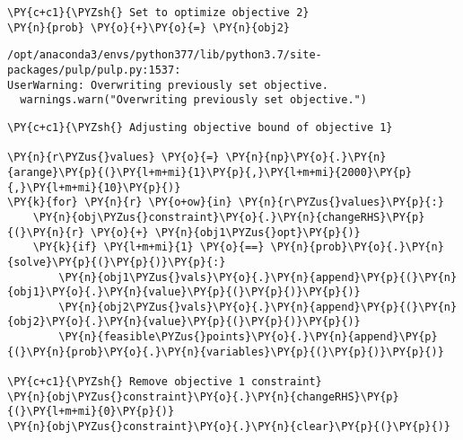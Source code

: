     \begin{tcolorbox}[breakable, size=fbox, boxrule=1pt, pad at break*=1mm,colback=cellbackground, colframe=cellborder]
\begin{Verbatim}[commandchars=\\\{\}]
\PY{c+c1}{\PYZsh{} Set to optimize objective 2}
\PY{n}{prob} \PY{o}{+}\PY{o}{=} \PY{n}{obj2}
\end{Verbatim}
\end{tcolorbox}

    \begin{Verbatim}[commandchars=\\\{\}]
/opt/anaconda3/envs/python377/lib/python3.7/site-packages/pulp/pulp.py:1537:
UserWarning: Overwriting previously set objective.
  warnings.warn("Overwriting previously set objective.")
    \end{Verbatim}

    \begin{tcolorbox}[breakable, size=fbox, boxrule=1pt, pad at break*=1mm,colback=cellbackground, colframe=cellborder]
\begin{Verbatim}[commandchars=\\\{\}]
\PY{c+c1}{\PYZsh{} Adjusting objective bound of objective 1}

\PY{n}{r\PYZus{}values} \PY{o}{=} \PY{n}{np}\PY{o}{.}\PY{n}{arange}\PY{p}{(}\PY{l+m+mi}{1}\PY{p}{,}\PY{l+m+mi}{2000}\PY{p}{,}\PY{l+m+mi}{10}\PY{p}{)}
\PY{k}{for} \PY{n}{r} \PY{o+ow}{in} \PY{n}{r\PYZus{}values}\PY{p}{:}
    \PY{n}{obj\PYZus{}constraint}\PY{o}{.}\PY{n}{changeRHS}\PY{p}{(}\PY{n}{r} \PY{o}{+} \PY{n}{obj1\PYZus{}opt}\PY{p}{)}
    \PY{k}{if} \PY{l+m+mi}{1} \PY{o}{==} \PY{n}{prob}\PY{o}{.}\PY{n}{solve}\PY{p}{(}\PY{p}{)}\PY{p}{:}
        \PY{n}{obj1\PYZus{}vals}\PY{o}{.}\PY{n}{append}\PY{p}{(}\PY{n}{obj1}\PY{o}{.}\PY{n}{value}\PY{p}{(}\PY{p}{)}\PY{p}{)}
        \PY{n}{obj2\PYZus{}vals}\PY{o}{.}\PY{n}{append}\PY{p}{(}\PY{n}{obj2}\PY{o}{.}\PY{n}{value}\PY{p}{(}\PY{p}{)}\PY{p}{)}
        \PY{n}{feasible\PYZus{}points}\PY{o}{.}\PY{n}{append}\PY{p}{(}\PY{n}{prob}\PY{o}{.}\PY{n}{variables}\PY{p}{(}\PY{p}{)}\PY{p}{)}

\PY{c+c1}{\PYZsh{} Remove objective 1 constraint}
\PY{n}{obj\PYZus{}constraint}\PY{o}{.}\PY{n}{changeRHS}\PY{p}{(}\PY{l+m+mi}{0}\PY{p}{)}
\PY{n}{obj\PYZus{}constraint}\PY{o}{.}\PY{n}{clear}\PY{p}{(}\PY{p}{)}
\end{Verbatim}
\end{tcolorbox}

